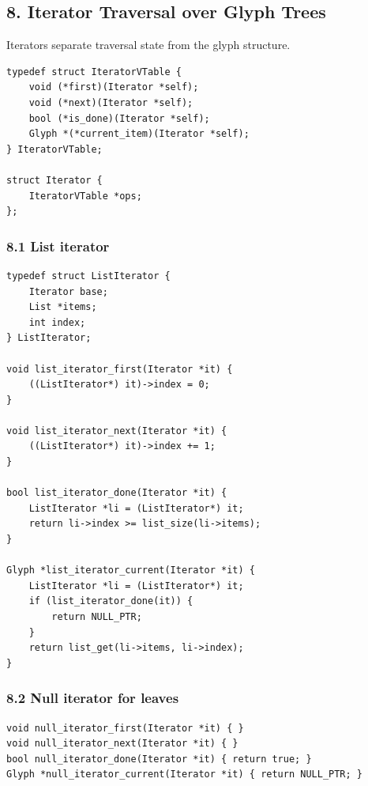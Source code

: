 \documentclass[11pt]{article}
\begin{document}
\subsection{8. Iterator Traversal over Glyph Trees}\label{iterator-traversal-over-glyph-trees}

Iterators separate traversal state from the glyph structure.

\begin{verbatim}
typedef struct IteratorVTable {
    void (*first)(Iterator *self);
    void (*next)(Iterator *self);
    bool (*is_done)(Iterator *self);
    Glyph *(*current_item)(Iterator *self);
} IteratorVTable;

struct Iterator {
    IteratorVTable *ops;
};
\end{verbatim}

\subsubsection{8.1 List iterator}\label{list-iterator}

\begin{verbatim}
typedef struct ListIterator {
    Iterator base;
    List *items;
    int index;
} ListIterator;

void list_iterator_first(Iterator *it) {
    ((ListIterator*) it)->index = 0;
}

void list_iterator_next(Iterator *it) {
    ((ListIterator*) it)->index += 1;
}

bool list_iterator_done(Iterator *it) {
    ListIterator *li = (ListIterator*) it;
    return li->index >= list_size(li->items);
}

Glyph *list_iterator_current(Iterator *it) {
    ListIterator *li = (ListIterator*) it;
    if (list_iterator_done(it)) {
        return NULL_PTR;
    }
    return list_get(li->items, li->index);
}
\end{verbatim}

\subsubsection{8.2 Null iterator for leaves}\label{null-iterator-for-leaves}

\begin{verbatim}
void null_iterator_first(Iterator *it) { }
void null_iterator_next(Iterator *it) { }
bool null_iterator_done(Iterator *it) { return true; }
Glyph *null_iterator_current(Iterator *it) { return NULL_PTR; }
\end{verbatim}
\end{document}
